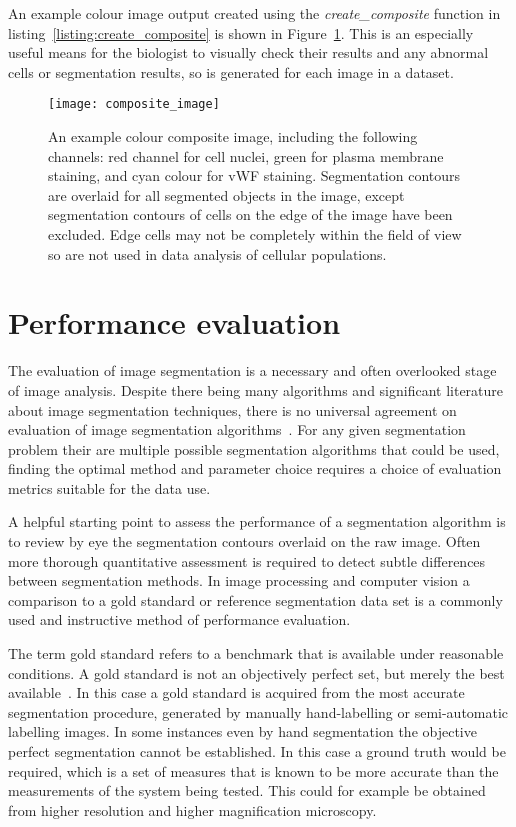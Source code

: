 An example colour image output created using the \emph{create\_composite} function in listing~\ref{listing:create_composite} is shown in Figure~\ref{figure:endothelial_morphometry:image_processing:composite_image}. This is an especially useful means for the biologist to visually check their results and any abnormal cells or segmentation results, so is generated for each image in a dataset.

\begin{figure}[htbp!] %
	\centering
	\texttt{[image: composite\_image]}
	\caption[Colour composite image with segmentation contours]{An example colour composite image, including the following channels: red channel for cell nuclei, green for plasma membrane staining, and cyan colour for vWF staining. Segmentation contours are overlaid for all segmented objects in the image, except segmentation contours of cells on the edge of the image have been excluded. Edge cells may not be completely within the field of view so are not used in data analysis of cellular populations.}
	\label{figure:endothelial_morphometry:image_processing:composite_image}
\end{figure}

\section{Performance evaluation}
\label{endothelial_morphometry:performance_evaluation}
The evaluation of image segmentation is a necessary and often overlooked stage of image analysis. Despite there being many algorithms and significant literature about image segmentation techniques, there is no universal agreement on evaluation of image segmentation algorithms~\cite{Benes2015}. For any given segmentation problem their are multiple possible segmentation algorithms that could be used, finding the optimal method and parameter choice requires a choice of evaluation metrics suitable for the data use.

A helpful starting point to assess the performance of a segmentation algorithm is to review by eye the segmentation contours overlaid on the raw image. Often more thorough quantitative assessment is required to detect subtle differences between segmentation methods. In image processing and computer vision a comparison to a gold standard or reference segmentation data set is a commonly used and instructive method of performance evaluation.

The term gold standard refers to a benchmark that is available under reasonable conditions. A gold standard is not an objectively perfect set, but merely the best available~\cite{Cardoso2014}. In this case a gold standard is acquired from the most accurate segmentation procedure, generated by manually hand-labelling or semi-automatic labelling images. In some instances even by hand segmentation the objective perfect segmentation cannot be established. In this case a ground truth would be required, which is a set of measures that is known to be more accurate than the measurements of the system being tested. This could for example be obtained from higher resolution and higher magnification microscopy.

